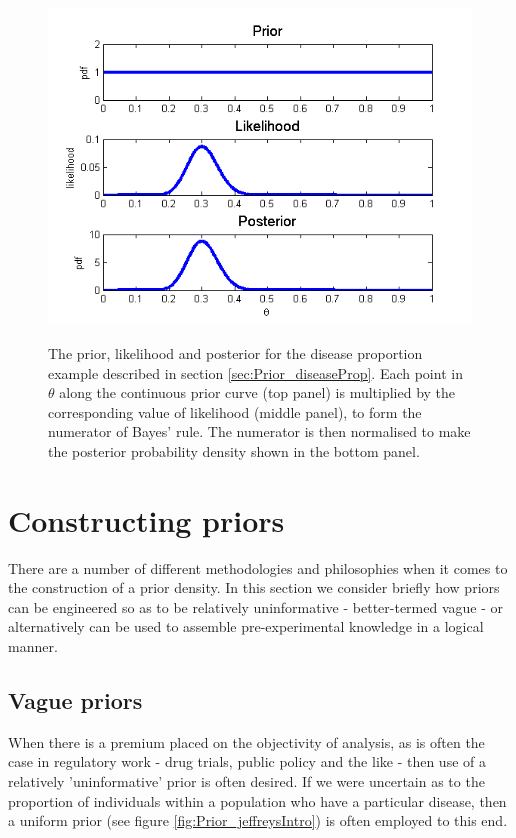 \documentclass[11pt,fullpage]{book}
\begin{document}
\begin{figure}
\centering
\scalebox{0.75} 
{\includegraphics{Prior_disease.png}}
\caption{The prior, likelihood and posterior for the disease proportion example described in section \ref{sec:Prior_diseaseProp}. Each point in $\theta$ along the continuous prior curve (top panel) is multiplied by the corresponding value of likelihood (middle panel), to form the numerator of Bayes' rule. The numerator is then normalised to make the posterior probability density shown in the bottom panel.}\label{fig:Prior_disease}
\end{figure}

\section{Constructing priors}
There are a number of different methodologies and philosophies when it comes to the construction of a prior density. In this section we consider briefly how priors can be engineered so as to be relatively uninformative - better-termed vague - or alternatively can be used to assemble pre-experimental knowledge in a logical manner.

\subsection{Vague priors}\label{sec:Prior_vague}
When there is a premium placed on the objectivity of analysis, as is often the case in regulatory work - drug trials, public policy and the like - then use of a relatively 'uninformative' prior is often desired. If we were uncertain as to the proportion of individuals within a population who have a particular disease, then a uniform prior (see figure \ref{fig:Prior_jeffreysIntro}) is often employed to this end. 
\end{document}
